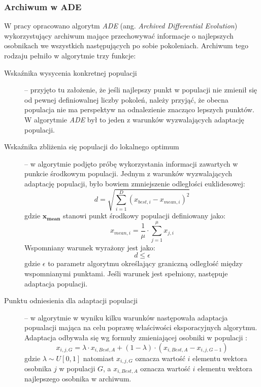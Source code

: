 \documentclass[12pt,a4paper]{report}
\begin{document}
{{{\subsubsection{Archiwum w ADE \cite{ArchivedDE,RobustArchiveDE}}
\par{
W pracy \cite{ArchivedDE} opracowano algorytm \emph{ADE} (ang. \emph{Archived Differential Evolution}) wykorzystujący archiwum mające przechowywać informacje o najlepszych osobnikach we wszystkich następujących po sobie pokoleniach. Archiwum tego rodzaju pełniło w algorytmie trzy funkcje:
\begin{description}
\item[Wskaźnika wysycenia konkretnej populacji] -- przyjęto tu założenie, że jeśli najlepszy punkt w populacji nie zmienił się od pewnej definiowalnej liczby pokoleń, należy przyjąć, że obecna populacja nie ma perspektyw na odnalezienie znacząco lepszych punktów. W algorytmie \emph{ADE} był to jeden z warunków wyzwalających adaptację populacji.
\item[Wskaźnika zbliżenia się populacji do lokalnego optimum] -- w algorytmie podjęto próbę wykorzystania informacji zawartych w punkcie środkowym populacji. Jednym z warunków wyzwalających adaptację populacji, było bowiem zmniejszenie odległości euklidesowej:
\begin{equation}
d = \sqrt{\sum_{i = 1}^{D}(x_{best,i} - x_{mean,i})^2}
\end{equation}
gdzie $\mathbf{x_{mean}}$ stanowi punkt środkowy populacji definiowany jako:
\begin{equation}
x_{mean,i} = \frac{1}{\mu} \cdot \sum_{j = 1}^{\mu}x_{j,i}
\end{equation}
Wspomniany warunek wyrażony jest jako:
\begin{equation}
d \le \epsilon
\end{equation}
gdzie $\epsilon$ to parametr algorytmu określający graniczną odległość między wspomnianymi punktami.
Jeśli warunek jest spełniony, następuje adaptacja populacji.
\item[Punktu odniesienia dla adaptacji populacji] -- w algorytmie w wyniku kilku warunków następowała adaptacja popualacji mająca na celu poprawę właściwości eksporacyjnych algorytmu. Adaptacja odbywała się wg formuły zmieniającej osobniki w populacji \cite{ArchivedDE}:
\begin{equation}
x_{i,j,G} = \lambda \cdot x_{i,Best,A} + (1 - \lambda) \cdot (x_{i,Best,A} - x_{i,j,G-1})
\end{equation}
gdzie $\lambda \sim U[0,1]$ natomiast $x_{i,j,G}$ oznacza wartość $i$ elementu wektora osobnika $j$ w populacji $G$, a $x_{i,Best,A}$ oznacza wartość $i$ elementu wektora najlepszego osobnika w archiwum.

\end{description}}}}}
\end{document}
